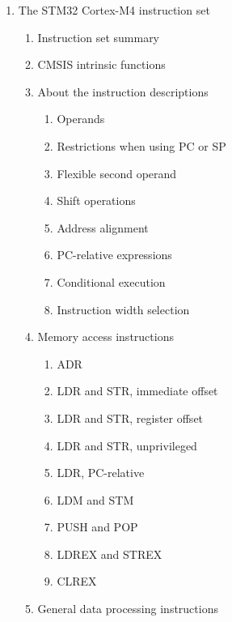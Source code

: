 \documentclass{article}
\begin{document}
\begin{enumerate}
\begin{enumerate}
\begin{enumerate}
        \end{enumerate}
    \end{enumerate}
    \item The STM32 Cortex-M4 instruction set 
    \begin{enumerate}
        \item Instruction set summary 
        \item CMSIS intrinsic functions 
        \item About the instruction descriptions 
        \begin{enumerate}
            \item Operands 
            \item Restrictions when using PC or SP 
            \item Flexible second operand 
            \item Shift operations 
            \item Address alignment 
            \item PC-relative expressions 
            \item Conditional execution 
            \item Instruction width selection 
        \end{enumerate}
        \item Memory access instructions 
        \begin{enumerate}
            \item ADR 
            \item LDR and STR, immediate offset 
            \item LDR and STR, register offset 
            \item LDR and STR, unprivileged 
            \item LDR, PC-relative 
            \item LDM and STM 
            \item PUSH and POP 
            \item LDREX and STREX 
            \item CLREX 
        \end{enumerate}
        \item General data processing instructions 
    \end{enumerate}
\end{enumerate}
\end{document}
